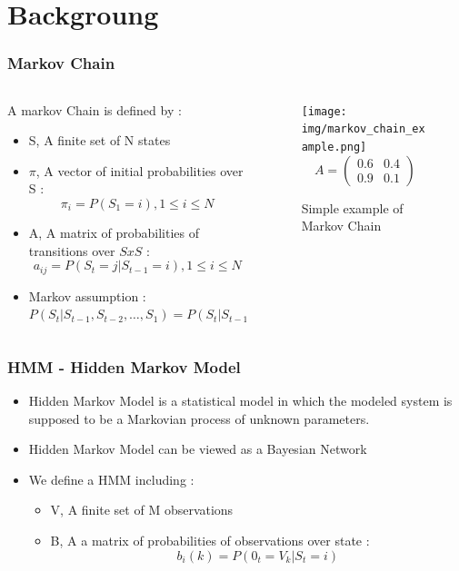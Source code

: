 \documentclass{beamer}
\begin{document}
\section{Backgroung}
\begin{frame}
  \frametitle{Markov Chain}
  \begin{columns}[T]
    \begin{column}{.7\textwidth}
      A markov Chain is defined by :
      \begin{itemize}[label=.]
      \item S, A finite set of N states
      \item $\pi$, A vector of initial probabilities over S :
        $$\pi_i = P(S_1 = i), 1 \leq i \leq N$$
      \item A, A matrix of probabilities of transitions over $SxS$ :
        $$a_{ij} = P(S_t = j | S_{t-1} = i), 1 \leq i \leq N$$
      \item Markov assumption :
        $P(S_t|S_{t-1},S_{t-2},\ldots,S_{1})=P(S_t|S_{t-1})$ 
      \end{itemize}
    \end{column}
    \begin{column}{.28\textwidth}
      \begin{figure}
        \texttt{[image: img/markov\_chain\_example.png]}
        $$
        A = \begin{pmatrix}
          0.6 & 0.4 \\
          0.9 & 0.1
        \end{pmatrix}
        $$
        \caption{Simple example of Markov Chain}
      \end{figure}
    \end{column}
  \end{columns}
\end{frame}

\begin{frame}
  \frametitle{HMM - Hidden Markov Model}
  \begin{itemize}[label=--]
  \item Hidden Markov Model is a statistical model in which the
    modeled system is supposed to be a Markovian process of unknown
    parameters.\pause
  \item Hidden Markov Model can be viewed as a Bayesian Network\pause
  \item We define a HMM including :
    \begin{itemize}
    \item V, A finite set of M observations
    \item B, A a matrix of probabilities of observations
      over state :
      $$b_i(k) = P(0_t=V_k | S_t = i)$$
    \end{itemize}
  \end{itemize}
\end{frame}
\end{document}
